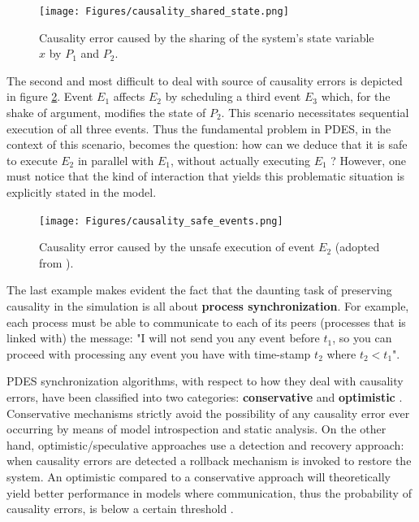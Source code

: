 \documentclass[12pt,twoside]{article}
\begin{document}
\begin{figure}[htb]
\centering
\texttt{[image: Figures/causality\_shared\_state.png]}
\caption{\label{fig:orgparagraph3}
Causality error caused by the sharing of the system's state variable \(x\) by \(P_1\) and \(P_2\).}
\end{figure}

The second and most difficult to deal with source of causality errors is depicted in figure \ref{fig:orgparagraph4}. 
Event \(E_1\) affects \(E_2\) by scheduling a third event \(E_3\) which, for the shake of argument, modifies the state of \(P_2\). 
This scenario necessitates sequential execution of all three events. 
Thus the fundamental problem in PDES, in the context of this scenario, becomes the question: how can we deduce that it is safe to execute \(E_2\) in parallel with \(E_1\), without actually executing \(E_1\) \cite{Fujimoto1990}?
However, one must notice that the kind of interaction that yields this problematic situation is explicitly stated in the model.

\begin{figure}[htb]
\centering
\texttt{[image: Figures/causality\_safe\_events.png]}
\caption{\label{fig:orgparagraph4}
Causality error caused by the unsafe execution of event \(E_2\) (adopted from \cite{Fujimoto1990}).}
\end{figure}

The last example makes evident the fact that the daunting task of preserving causality in the simulation is all about \textbf{process synchronization}.
For example, each process must be able to communicate to each of its peers (processes that is linked with) the message: 
"I will not send you any event before \(t_1\), so you can proceed with processing any event you have with time-stamp \(t_2\) where \(t_2 < t_1\)".

PDES synchronization algorithms, with respect to how they deal with causality errors, have been classified into two categories: \textbf{conservative} and \textbf{optimistic} \cite{Fujimoto2015}.
Conservative mechanisms strictly avoid the possibility of any causality error ever occurring by means of model introspection and static analysis.
On the other hand, optimistic/speculative approaches use a detection and recovery approach: when causality errors are detected a rollback mechanism is invoked to restore the system.
An optimistic compared to a conservative approach will theoretically yield better performance in models where communication, thus the probability of causality errors, is below a certain threshold \cite{Fujimoto1990}.
\end{document}
